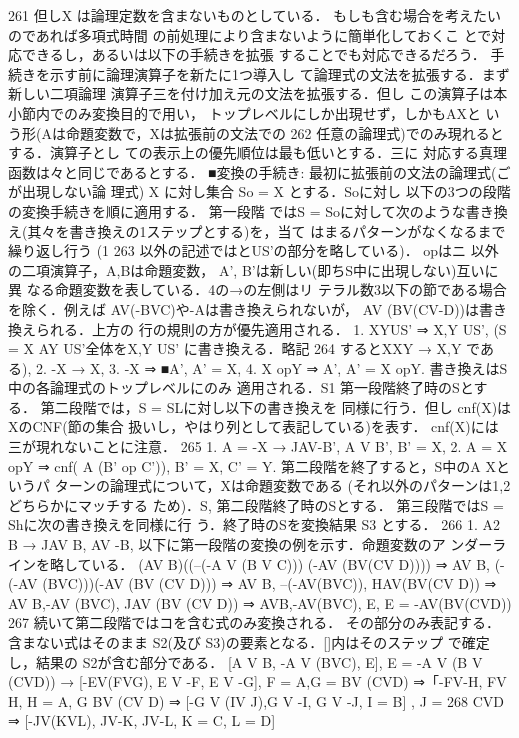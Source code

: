 \documentclass{ltjsarticle}
\theoremstyle{mystyle1}
\theoremstyle{mystyle2}
\begin{document}
261
但しX は論理定数を含まないものとしている． もしも含む場合を考えたいのであれば多項式時間 の前処理により含まないように簡単化しておくこ とで対応できるし，あるいは以下の手続きを拡張 することでも対応できるだろう． 手続きを示す前に論理演算子を新たに1つ導入し て論理式の文法を拡張する．まず新しい二項論理 演算子三を付け加え元の文法を拡張する．但し この演算子は本小節内でのみ変換目的で用い， トップレベルにしか出現せず，しかもAXと いう形(Aは命題変数で，Xは拡張前の文法での
262
任意の論理式)でのみ現れるとする．演算子とし ての表示上の優先順位は最も低いとする．三に 対応する真理函数は々と同じであるとする．
■変換の手続き: 最初に拡張前の文法の論理式(ごが出現しない論 理式) X に対し集合 So = {X} とする．Soに対し 以下の3つの段階の変換手続きを順に適用する． 第一段階 ではS = Soに対して次のような書き換 え(其々を書き換えの1ステップとする)を，当て はまるパターンがなくなるまで繰り返し行う (1
263
以外の記述では{と}US'の部分を略している)． opはニ 以外の二項演算子，A,Bは命題変数， A', B'は新しい(即ちS中に出現しない)互いに異 なる命題変数を表している．4の→の左側はリ テラル数3以下の節である場合を除く．例えば AV(-BVC)や-Aは書き換えられないが， AV (BV(CV-D))は書き換えられる．上方の 行の規則の方が優先適用される．
1. {XY}US' ⇒ {X,Y} US', (S = {X AY
}US'全体を{X,Y} US' に書き換える．略記
264
するとXXY → X,Y である), 2. -X → X, 3. -X ⇒ ■A', A' = X, 4. X opY ⇒ A', A' = X opY. 書き換えはS中の各論理式のトップレベルにのみ 適用される．S1 第一段階終了時のSとする． 第二段階では，S = SLに対し以下の書き換えを 同様に行う．但し cnf(X)はXのCNF(節の集合 扱いし，やはり列として表記している)を表す． cnf(X)には三が現れないことに注意．
265
1. A = -X → JAV-B', A V B', B' = X, 2. A = X opY ⇒
cnf( A (B' op C')), B' = X, C' = Y. 第二段階を終了すると，S中のA Xというパ ターンの論理式について，Xは命題変数である (それ以外のパターンは1,2どちらかにマッチする ため)．S, 第二段階終了時のSとする． 第三段階ではS = Shに次の書き換えを同様に行
う．終了時のSを変換結果 S3 とする．
266
1. A2 B → JAV B, AV -B,
以下に第一段階の変換の例を示す．命題変数のア ンダーラインを略している．
(AV B)((--(-A V (B V C)))  (-AV
(BV(CV D)))) ⇒ AV B, (-(-AV (BVC)))(-AV (BV
(CV D))) ⇒ AV B, --(-AV(BVC)), HAV(BV(CV D)) ⇒ AV B,-AV (BVC), JAV (BV (CV D)) ⇒ AVB,-AV(BVC), E, E = -AV(BV(CVD))
267
続いて第二段階ではコを含む式のみ変換される． その部分のみ表記する．含まない式はそのまま S2(及び S3)の要素となる．[]内はそのステップ で確定し，結果の S2が含む部分である．
[A V B, -A V (BVC), E],
E = -A V (B V (CVD)) → [-EV(FVG), E V -F, E V -G],
F = A,G = BV (CVD) ⇒「-FV-H, FV H, H = A, G BV (CV D) ⇒ [-G V (IV J),G V -I, G V -J, I = B] , J =
268
CVD ⇒ [-JV(KVL), JV-K, JV-L, K = C, L = D]
\end{document}

